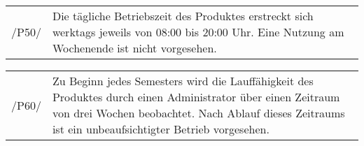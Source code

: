 \begin{tabular}{p{1.5cm}p{14.5cm}}	
	 /P50/& Die tägliche Betriebszeit des Produktes erstreckt sich werktags jeweils von 08:00 bis 20:00 Uhr. Eine Nutzung am Wochenende ist nicht vorgesehen. \\[0.25cm]
\end{tabular}

\begin{tabular}{p{1.5cm}p{14.5cm}}	
	 /P60/& Zu Beginn jedes Semesters wird die Lauffähigkeit des Produktes durch einen Administrator über einen Zeitraum von drei Wochen beobachtet. Nach Ablauf dieses Zeitraums ist ein unbeaufsichtigter Betrieb vorgesehen. \\[0.25cm]
\end{tabular}
